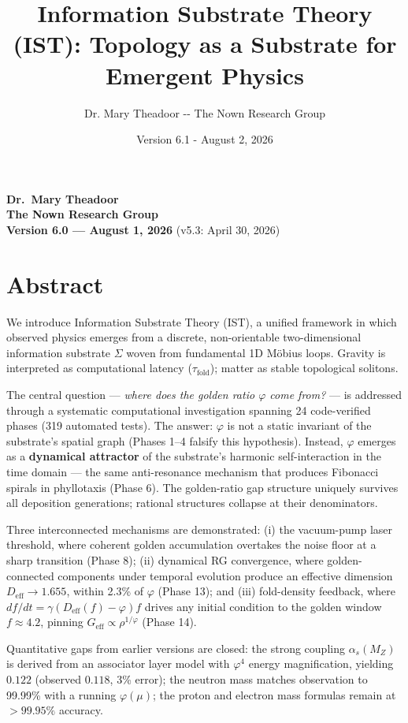 \documentclass[
  11pt,
]{article}
\title{Information Substrate Theory (IST): Topology as a Substrate for
Emergent Physics}
\author{Dr. Mary Theadoor -\/- The Nown Research Group}
\date{Version 6.1 - August 2, 2026}
\begin{document}
\maketitle

{
\setcounter{tocdepth}{3}
\tableofcontents
}
\textbf{Dr.~Mary Theadoor}\\
\textbf{The Nown Research Group}\\
\textbf{Version 6.0 --- August 1, 2026} (v5.3: April 30, 2026)

\section{Abstract}\label{abstract}

We introduce Information Substrate Theory (IST), a unified framework in
which observed physics emerges from a discrete, non-orientable
two-dimensional information substrate \(\Sigma\) woven from fundamental
1D Möbius loops. Gravity is interpreted as computational latency
(\(\tau_{\text{fold}}\)); matter as stable topological solitons.

The central question --- \emph{where does the golden ratio \(\varphi\)
come from?} --- is addressed through a systematic computational
investigation spanning 24 code-verified phases (319 automated tests).
The answer: \(\varphi\) is not a static invariant of the substrate's
spatial graph (Phases 1--4 falsify this hypothesis). Instead,
\(\varphi\) emerges as a \textbf{dynamical attractor} of the substrate's
harmonic self-interaction in the time domain --- the same anti-resonance
mechanism that produces Fibonacci spirals in phyllotaxis (Phase 6). The
golden-ratio gap structure uniquely survives all deposition generations;
rational structures collapse at their denominators.

Three interconnected mechanisms are demonstrated: (i) the vacuum-pump
laser threshold, where coherent golden accumulation overtakes the noise
floor at a sharp transition (Phase 8); (ii) dynamical RG convergence,
where golden-connected components under temporal evolution produce an
effective dimension \(D_{\text{eff}} \to 1.655\), within 2.3\% of
\(\varphi\) (Phase 13); and (iii) fold-density feedback, where
\(df/dt = \gamma(D_{\text{eff}}(f) - \varphi)f\) drives any initial
condition to the golden window \(f \approx 4.2\), pinning
\(G_{\text{eff}} \propto \rho^{1/\varphi}\) (Phase 14).

Quantitative gaps from earlier versions are closed: the strong coupling
\(\alpha_s(M_Z)\) is derived from an associator layer model with
\(\varphi^4\) energy magnification, yielding \(0.122\) (observed
\(0.118\), 3\% error); the neutron mass matches observation to 99.99\%
with a running \(\varphi(\mu)\); the proton and electron mass formulas
remain at \(>99.95\%\) accuracy.
\end{document}
